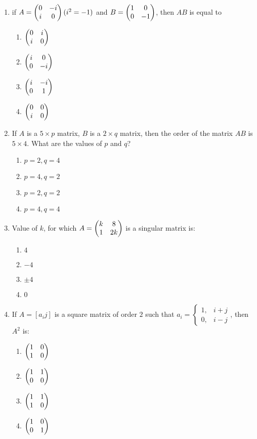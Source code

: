 \documentclass{article}
\begin{document}
\begin{enumerate}
    \item if $A = \begin{pmatrix}0 & -i \\ i & 0\end{pmatrix} (i^2 = -1)$ and  $B = \begin{pmatrix}1 & 0 \\ 0 & -1\end{pmatrix}$, then $AB$ is equal to
    \begin{enumerate}
        \item $\begin{pmatrix}0 & i \\ i & 0\end{pmatrix}$
        \item $\begin{pmatrix}i & 0 \\ 0 & -i\end{pmatrix}$
        \item $\begin{pmatrix}i & -i \\ 0 & 1\end{pmatrix}$
        \item $\begin{pmatrix}0 & 0 \\ i & 0\end{pmatrix}$
    \end{enumerate}
   
   \item If $A$ is a $5 \times p$ matrix, $B$ is a $2 \times q$ matrix, then the order of the matrix $AB$ is $5 \times 4$. What are the values of $p$ and $q$?
   \begin{enumerate}
       \item $p = 2, q = 4$
       \item $p = 4, q = 2$
       \item $p = 2, q = 2$
       \item $p = 4, q = 4$
   \end{enumerate}

   \item Value of $k$, for which $A =\begin{pmatrix}k & 8 \\ 1 & 2k\end{pmatrix}$ is a singular matrix is:
    \begin{enumerate}
        \item $4$
        \item $-4$
        \item $\pm4$
        \item $0$
    \end{enumerate}
        
    \item If $A = [a_{i}{j}]$ is a square matrix of order $2$ such that $a_{i} = \begin{cases}1, & i + j \\0, & i-j
    \end{cases}$, then $A^2$ is:
    \begin{enumerate}
        \item $\begin{pmatrix}1 & 0 \\ 1 & 0\end{pmatrix}$
        \item $\begin{pmatrix}1 & 1 \\ 0 & 0\end{pmatrix}$
        \item $\begin{pmatrix}1 & 1 \\ 1 & 0\end{pmatrix}$
        \item $\begin{pmatrix}1 & 0 \\ 0 & 1\end{pmatrix}$
    \end{enumerate}
    
\end{enumerate}
\end{document}
